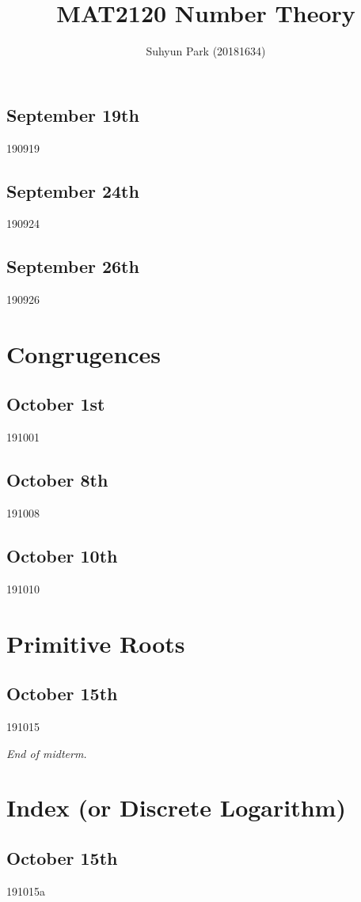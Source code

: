 



\title{MAT2120 Number Theory}
\author{Suhyun Park (20181634)}

\subsection{September 19th}
{190919}

\subsection{September 24th}
{190924}

\subsection{September 26th}
{190926}

\section{Congrugences}
\subsection{October 1st}
{191001}

\subsection{October 8th}
{191008}

\subsection{October 10th}
{191010}

\section{Primitive Roots}
\subsection{October 15th}
{191015}

\noindent\makebox[\linewidth]{\rule{\linewidth}{0.4pt}}
\begin{flushright}
    \textit{End of midterm.}
\end{flushright}

\newpage
\section{Index (or Discrete Logarithm)}
\subsection{October 15th}
{191015a}


